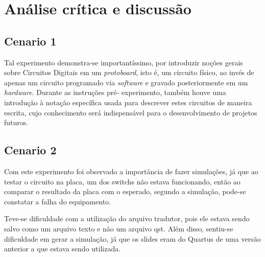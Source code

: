 \chapter{Análise crítica e discussão}
\section{Cenario 1}
	Tal experimento demonstra-se importantíssimo, por introduzir noções gerais sobre
	Circuitos Digitais em um \textit{protoboard}, isto é, um circuito físico, ao invés de apenas um circuito
	programado via \textit{software} e gravado posteriormente em um \textit{hardware}. Durante as instruções pré-
	experimento, também houve uma introdução à notação específica usada para descrever estes circuitos
	de maneira escrita, cujo conhecimento será indispensável para o desenvolvimento de projetos futuros.

\section{Cenario 2}
	Com este experimento foi observado a importância de fazer simulações, já que ao testar o circuito na placa,
	um dos switchs não estava funcionando, então ao comparar o resultado da placa com o esperado,
	 segundo a simulação, pode-se constatar a falha do equipamento.

	 Teve-se dificuldade com a utilização do arquivo tradutor, pois ele estava sendo salvo como um arquivo texto
	 e não um arquivo qst. Além disso, sentiu-se dificuldade em gerar a simulação, já que os slides eram do Quartus
	 de uma versão anterior a que estava sendo utilizada.

